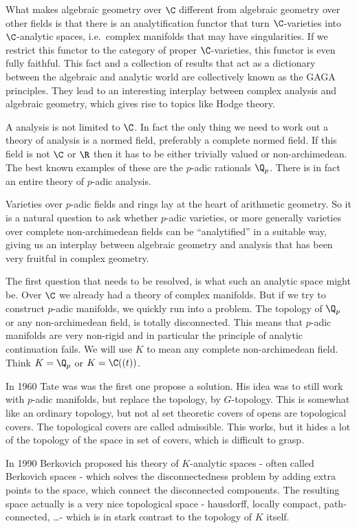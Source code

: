 What makes algebraic geometry over $\C$ different from algebraic geometry over other fields is that there is an analytification functor that turn $\C$-varieties into $\C$-analytic spaces, i.e.\ complex manifolds that may have singularities. 
If we restrict this functor to the category of proper  $\C$-varieties, this functor is even fully faithful. This fact and a collection of results that act as a dictionary between the algebraic and analytic world are collectively known as the GAGA principles. 
They lead to an interesting interplay between complex analysis and algebraic geometry, which gives rise to topics like Hodge theory. 

A analysis is not limited to $\C$. In fact the only thing we need to work out a theory of analysis is a normed field, preferably a complete normed field. 
If this field is not $\C$ or $\R$ then it has to be either trivially valued or non-archimedean. 
The best known examples of these are the $p$-adic rationals $\Q_p$. 
There is in fact an entire theory of $p$-adic analysis. 

Varieties over $p$-adic fields and rings lay at the heart of arithmetic geometry. 
So it is a natural question to ask whether $p$-adic varieties, or more generally varieties over complete non-archimedean fields can be ``analytified'' in a suitable way, giving us an interplay between algebraic geometry and analysis that has been very fruitful in complex geometry. 

The first question that needs to be resolved, is what such an analytic space might be.
Over $\C$ we already had a theory of complex manifolds.
But if we try to construct $p$-adic manifolds, we quickly run into a problem.
The topology of $\Q_p$ or any non-archimedean field, is totally disconnected. 
This means that $p$-adic manifolds are very non-rigid and in particular the principle of analytic continuation fails. 
We will use $K$ to mean any complete non-archimedean field. Think $K = \Q_p$ or $K = \C((t))$. 

In 1960 Tate was was the first one propose a solution. 
His idea was to still work with $p$-adic manifolds, but replace the topology, by $G$-topology. 
This is somewhat like an ordinary topology, but not al set theoretic covers of opens are topological covers. 
The topological covers are called admissible.
This works, but it hides a lot of the topology of the space in set of covers, which is difficult to grasp.

In 1990 Berkovich proposed his theory of $K$-analytic spaces - often called Berkovich spaces - which solves the disconnectedness problem by adding extra points to the space, which connect the disconnected components. 
The resulting space actually is a very nice topological space - hausdorff, locally compact, path-connected, \ldots - which is in stark contrast to the topology of $K$ itself.  


